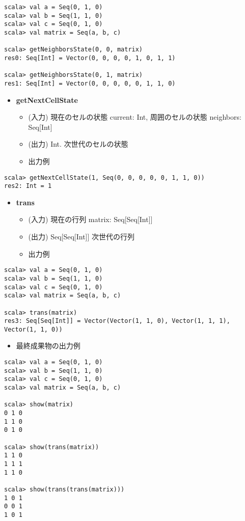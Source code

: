 \documentclass[a4j]{article}
\begin{document}
\begin{itemize}
\begin{verbatim}
scala> val a = Seq(0, 1, 0)      
scala> val b = Seq(1, 1, 0)      
scala> val c = Seq(0, 1, 0)      
scala> val matrix = Seq(a, b, c)                           

scala> getNeighborsState(0, 0, matrix)
res0: Seq[Int] = Vector(0, 0, 0, 0, 1, 0, 1, 1)

scala> getNeighborsState(0, 1, matrix)
res1: Seq[Int] = Vector(0, 0, 0, 0, 0, 1, 1, 0)
\end{verbatim}
\begin{itemize}
\item \textbf{getNextCellState}
\begin{itemize}
\item (入力) 現在のセルの状態 current: Int, 周囲のセルの状態 neighbors: Seq[Int]
\item (出力) Int. 次世代のセルの状態
\item 出力例
\end{itemize}
\end{itemize}

\begin{verbatim}
scala> getNextCellState(1, Seq(0, 0, 0, 0, 0, 1, 1, 0))
res2: Int = 1
\end{verbatim}
\begin{itemize}
\item \textbf{trans}
\begin{itemize}
\item (入力) 現在の行列 matrix: Seq[Seq[Int]]
\item (出力) Seq[Seq[Int]] 次世代の行列
\item 出力例
\end{itemize}
\end{itemize}

\begin{verbatim}
scala> val a = Seq(0, 1, 0)      
scala> val b = Seq(1, 1, 0)      
scala> val c = Seq(0, 1, 0)      
scala> val matrix = Seq(a, b, c)                           

scala> trans(matrix)
res3: Seq[Seq[Int]] = Vector(Vector(1, 1, 0), Vector(1, 1, 1),
Vector(1, 1, 0))
\end{verbatim}

\begin{itemize}
\item 最終成果物の出力例
\end{itemize}

\begin{verbatim}
scala> val a = Seq(0, 1, 0)      
scala> val b = Seq(1, 1, 0)      
scala> val c = Seq(0, 1, 0)      
scala> val matrix = Seq(a, b, c)                           

scala> show(matrix)
0 1 0
1 1 0
0 1 0

scala> show(trans(matrix))
1 1 0
1 1 1
1 1 0

scala> show(trans(trans(matrix)))
1 0 1
0 0 1
1 0 1
\end{verbatim}
\end{itemize} %
\end{document}
